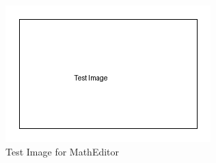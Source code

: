 \documentclass{article}
\begin{document}
\begin{figure}[htbp]
    \centering
    \includegraphics{image_7216bf35.png}
    \caption{Test Image for MathEditor}
    \label{fig:math_editor_test}
\end{figure}
\end{document}
